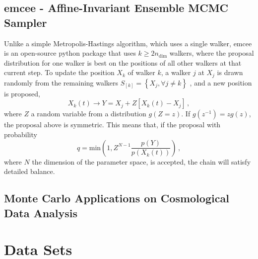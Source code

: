 \documentclass{book}
\begin{document}
	\section{emcee - Affine-Invariant Ensemble MCMC Sampler}
	Unlike a simple Metropolis-Hastings algorithm, which uses a single walker, emcee is an open-source python package that uses $k \geq 2 n_\text{dim}$ walkers, where the proposal distribution for one walker is best on the positions of all other walkers at that current step. To update the position $X_k$ of walker $k$, a walker $j$ at $X_j$ is drawn randomly from the remaining walkers $S_{\left[ k\right]} =\left\lbrace  X_j, \forall j \neq k \right\rbrace$ , and a new position is proposed,
	\begin{equation}
		X_k(t)\to Y=X_j + Z \left[ X_k(t)-X_j \right] \, ,
	\end{equation}
	where $Z$ a random variable from a distribution $g(Z=z)$. If $g(z^{-1})=zg(z)$, the proposal above is symmetric. This means that, if the proposal with probability
	\begin{equation}
		q=\text{min}\left( 1,Z^{N-1} \frac{p(Y)}{p(X_k(t))} \right) \, ,
	\end{equation}
	where $N$ the dimension of the parameter space, is accepted, the chain will satisfy detailed balance. 
	\section{Monte Carlo Applications on Cosmological Data Analysis}
	
	
	
	\appendix
	\chapter{Data Sets}
	\label{DataSets}
\end{document}
